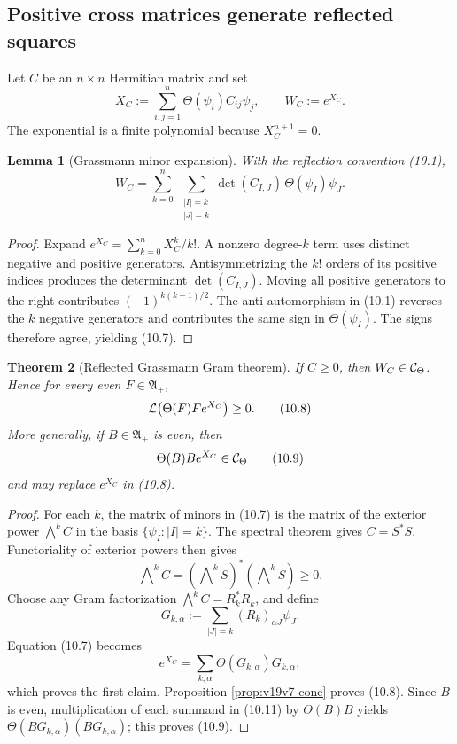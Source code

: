 \documentclass[11pt]{article}
\newtheorem{theorem}{Theorem}[section]
\newtheorem{lemma}[theorem]{Lemma}
\theoremstyle{remark}
\begin{document}
\subsection{Positive cross matrices generate reflected squares}

Let \(C\) be an \(n\times n\) Hermitian matrix and set
\[
 X_C:=\sum_{i,j=1}^n\Theta(\psi_i)C_{ij}\psi_j,\qquad
 W_C:=e^{X_C}.                                                  \tag{10.6}
\]
The exponential is a finite polynomial because \(X_C^{n+1}=0\).

\begin{lemma}[Grassmann minor expansion]
\label{lem:v19v7-minors}
With the reflection convention (10.1),
\[
 W_C
 =\sum_{k=0}^n\ \sum_{\substack{|I|=k\\|J|=k}}
   \det(C_{I,J})\,\Theta(\psi_I)\psi_J.                        \tag{10.7}
\]
\end{lemma}

\begin{proof}
Expand \(e^{X_C}=\sum_{k=0}^nX_C^k/k!\).  A nonzero degree-\(k\) term uses
distinct negative and positive generators.  Antisymmetrizing the \(k!\)
orders of its positive indices produces the determinant
\(\det(C_{I,J})\).  Moving all positive generators to the right contributes
\((-1)^{k(k-1)/2}\).  The anti-automorphism in (10.1) reverses the \(k\)
negative generators and contributes the same sign in
\(\Theta(\psi_I)\).  The signs therefore agree, yielding (10.7).
\end{proof}

\begin{theorem}[Reflected Grassmann Gram theorem]
\label{thm:v19v7-gram}
If \(C\geq0\), then \(W_C\in{\cal C}_\Theta\).  Hence for every even
\(F\in{\mathfrak A}_+\),
\[
 {\cal L}\!\left(\Theta(F)F e^{X_C}\right)\geq0.               \tag{10.8}
\]
More generally, if \(B\in{\mathfrak A}_+\) is even, then
\[
 \Theta(B)B e^{X_C}\in{\cal C}_\Theta                         \tag{10.9}
\]
and may replace \(e^{X_C}\) in (10.8).
\end{theorem}

\begin{proof}
For each \(k\), the matrix of minors in (10.7) is the matrix of the exterior
power \(\bigwedge^kC\) in the basis \(\{\psi_I:|I|=k\}\).
The spectral theorem gives \(C=S^*S\).  Functoriality of exterior powers
then gives
\[
 \bigwedge\nolimits^kC
 =(\bigwedge\nolimits^kS)^*(\bigwedge\nolimits^kS)\geq0.       \tag{10.10}
\]
Choose any Gram factorization
\(\bigwedge^kC=R_k^*R_k\), and define
\[
 G_{k,\alpha}:=\sum_{|J|=k}(R_k)_{\alpha J}\psi_J.
\]
Equation (10.7) becomes
\[
 e^{X_C}=\sum_{k,\alpha}\Theta(G_{k,\alpha})G_{k,\alpha},      \tag{10.11}
\]
which proves the first claim.  Proposition \ref{prop:v19v7-cone} proves
(10.8).  Since \(B\) is even, multiplication of each summand in (10.11)
by \(\Theta(B)B\) yields
\(\Theta(BG_{k,\alpha})(BG_{k,\alpha})\); this proves (10.9).
\end{proof}
\end{document}
